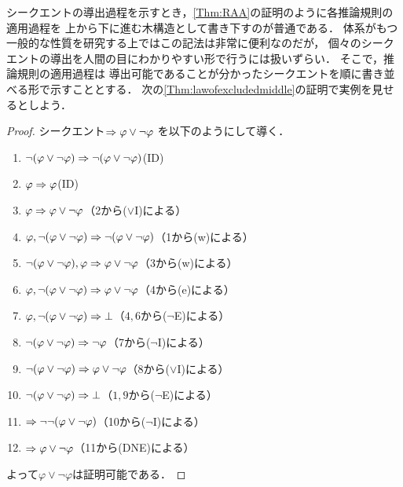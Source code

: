 シークエントの導出過程を示すとき，\cref{Thm:RAA}の証明のように各推論規則の適用過程を
上から下に進む木構造として書き下すのが普通である．
体系がもつ一般的な性質を研究する上ではこの記法は非常に便利なのだが，
個々のシークエントの導出を人間の目にわかりやすい形で行うには扱いずらい．
そこで，推論規則の適用過程は
導出可能であることが分かったシークエントを順に書き並べる形で示すこととする．
次の\cref{Thm:lawofexcludedmiddle}の証明で実例を見せるとしよう．


\begin{proof}
	シークエント\(\Rightarrow \varphi \lor \lnot \varphi\)
	を以下のようにして導く．
	\begin{enumerate}
		\item \(\lnot \paren{\varphi \lor \lnot \varphi} \sequent \lnot \paren{\varphi \lor \lnot \varphi}\)\quad (ID)
		\item \(\varphi \Rightarrow \varphi\)\quad (ID)
		\item \(\varphi \Rightarrow \varphi \lor \lnot \varphi\)\quad （2から(\(\lor\)I)による）
		\item \(\varphi, \lnot \paren{\varphi \lor \lnot \varphi} \sequent \lnot \paren{\varphi \lor \lnot \varphi}\)\quad （1から(w)による）
		\item \(\lnot \paren{\varphi \lor \lnot \varphi}, \varphi \sequent \varphi \lor \lnot \varphi\)\quad （3から(w)による）
		\item \(\varphi,\lnot \paren{\varphi \lor \lnot \varphi} \sequent \varphi \lor \lnot \varphi\)\quad （4から(e)による）
		\item \(\varphi, \lnot \paren{\varphi \lor \lnot \varphi} \sequent \bot\)\quad （\(4,6\)から(\(\lnot\)E)による）
		\item \(\lnot \paren{\varphi \lor \lnot \varphi} \sequent \lnot \varphi\)\quad （7から(\(\lnot\)I)による）
		\item \(\lnot \paren{\varphi \lor \lnot \varphi} \sequent \varphi \lor \lnot \varphi\)\quad （8から(\(\lor\)I)による）
		\item \(\lnot \paren{\varphi \lor \lnot \varphi} \sequent \bot\)\quad （\(1,9\)から(\(\lnot\)E)による）
		\item \(\sequent \lnot \lnot \paren{\varphi \lor \lnot \varphi}\)\quad （10から(\(\lnot\)I)による）
		\item \(\Rightarrow \varphi \lor \lnot \varphi\)\quad （11から(DNE)による）
	\end{enumerate}
	よって\(\varphi \lor \lnot \varphi\)は証明可能である．
\end{proof}

